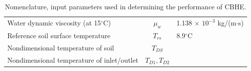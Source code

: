 \begin{table}[h!]
\begin{center}
\begin{tabular}{lcl}
                Water dynamic viscosity (at 15$^{\circ}$C) & $\mu_{w}$ & 1.138 $\times$ $10^{-3}$ kg/(m$\cdot$s)\\
                Reference soil surface temperature & $T_{rs}$ & 8.9$^\circ$C\\
                Nondimensional temperature of soil & $T_{DS}$ &\\
                Nondimensional temperature of inlet/outlet & $T_{D1},T_{D2}$ &\\
                \hline
            \end{tabular}
            \end{center}
            \caption{\label{table 2}Nomenclature, input parameters used in determining the performance of CBHE.}\label{tb:inputs_val}
	\end{table} 
	
